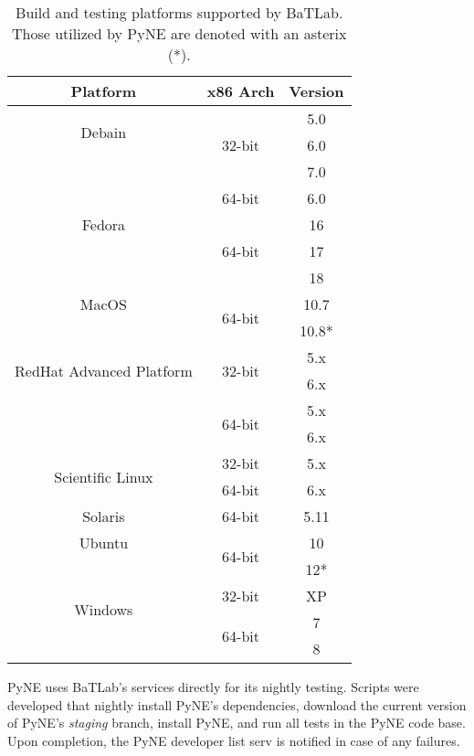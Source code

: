 \documentclass{anstrans}
\begin{document}
\begin{table}[ht]
  \begin{center}
    \caption{\label{tab::batlab}Build and testing platforms supported by BaTLab. 
      Those utilized by PyNE are denoted with an asterix (*).}
    \begin{tabular}{|c|c|c|}
    \hline
    Platform & x86 Arch & Version \\
    \hline
    \multirow{2}{*}{Debain} 
    & \multirow{3}{*}{32-bit} & 5.0 \\ & & 6.0 \\ & & 7.0 \\ 
    \cline{2-3}
    & \multirow{1}{*}{64-bit} & 6.0 \\
    \hline
    \multirow{1}{*}{Fedora} 
    & \multirow{3}{*}{64-bit} & 16 \\ & & 17 \\ & & 18 \\
    \hline
    \multirow{1}{*}{MacOS} 
    & \multirow{2}{*}{64-bit} & 10.7 \\ & & 10.8* \\
    \hline
    \multirow{2}{*}{RedHat Advanced Platform} 
    & \multirow{2}{*}{32-bit} & 5.x \\ & & 6.x \\ 
    \cline{2-3}
    & \multirow{2}{*}{64-bit} & 5.x \\ & & 6.x \\
    \hline
    \multirow{2}{*}{Scientific Linux} 
    & \multirow{1}{*}{32-bit} & 5.x \\ 
    \cline{2-3}
    & \multirow{1}{*}{64-bit} & 6.x \\
    \hline
    \multirow{1}{*}{Solaris} 
    & \multirow{1}{*}{64-bit} & 5.11 \\
    \hline
    \multirow{1}{*}{Ubuntu} 
    & \multirow{2}{*}{64-bit} & 10 \\ & & 12* \\
    \hline
    \multirow{2}{*}{Windows} 
    & \multirow{1}{*}{32-bit} & XP \\ 
    \cline{2-3}
    & \multirow{2}{*}{64-bit} & 7 \\ & & 8 \\
    \hline
    \end{tabular}
  \end{center}
\end{table}

PyNE uses BaTLab's services directly for its nightly testing. Scripts were
developed that nightly install PyNE's dependencies, download the current version
of PyNE's \textit{staging} branch, install PyNE, and run all tests in the PyNE
code base. Upon completion, the PyNE developer list serv is notified in case of
any failures.
\end{document}
